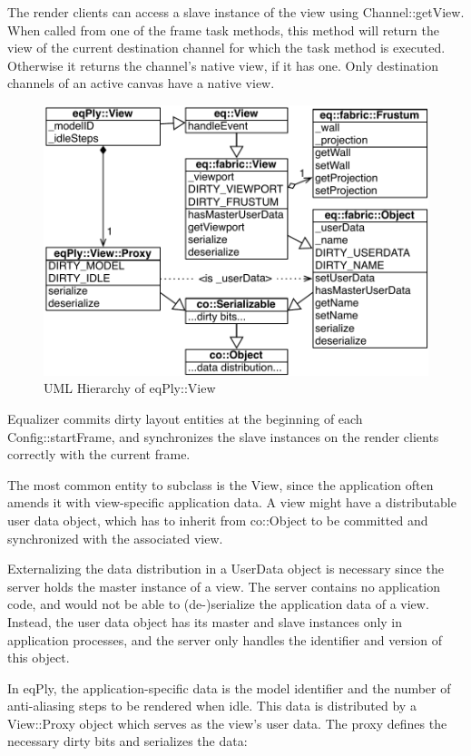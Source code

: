 \documentclass[10pt,a4]{scrartcl}
\begin{document}
The render clients can access a slave instance of the view using
\textsf{Channel::getView}. When called from one of the frame task
methods, this method will return the view of the current destination
channel for which the task method is executed. Otherwise it returns the
channel's native view, if it has one. Only destination channels of an
active canvas have a native view.

\begin{figure}
  \includegraphics[width=.612\textwidth]{images/viewUML.pdf}
  {\caption{\label{fViewUML}UML Hierarchy of \textsf{eqPly::View}}}
\end{figure}
Equalizer commits dirty layout entities at the beginning of each
\textsf{Config::startFrame}, and synchronizes the slave instances on the
render clients correctly with the current frame.

The most common entity to subclass is the \textsf{View}, since the application
often amends it with view-specific application data. A view might have a
distributable user data object, which has to inherit from \textsf{co::Object} to
be committed and synchronized with the associated view.

Externalizing the data distribution in a \textsf{UserData} object is necessary
since the server holds the master instance of a view. The server contains no
application code, and would not be able to (de-)serialize the application data
of a view. Instead, the user data object has its master and slave instances only
in application processes, and the server only handles the identifier and version
of this object.

In \textsf{eqPly}, the application-specific data is the model identifier and the
number of anti-aliasing steps to be rendered when idle. This data is distributed
by a \textsf{View::Proxy} object which serves as the view's user data. The proxy
defines the necessary dirty bits and serializes the data:
\end{document}
